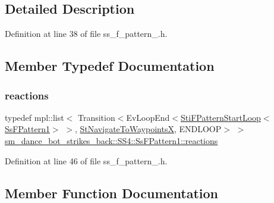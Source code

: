 \subsection{Detailed Description}


Definition at line 38 of file ss\+\_\+f\+\_\+pattern\+\_.\+h.



\subsection{Member Typedef Documentation}
\mbox{\label{structsm__dance__bot__strikes__back_1_1SS4_1_1SsFPattern1_acd918a85c4fdc759f80340faf7652b7d}} 
\subsubsection{\texorpdfstring{reactions}{reactions}}
{\footnotesize\ttfamily typedef mpl\+::list$<$ Transition$<$Ev\+Loop\+End$<$\hyperlink{structsm__dance__bot__strikes__back_1_1f__pattern__states_1_1StiFPatternStartLoop}{Sti\+F\+Pattern\+Start\+Loop}$<$\hyperlink{structsm__dance__bot__strikes__back_1_1SS4_1_1SsFPattern1}{Ss\+F\+Pattern1}$>$ $>$, \hyperlink{structsm__dance__bot__strikes__back_1_1StNavigateToWaypointsX}{St\+Navigate\+To\+WaypointsX}, E\+N\+D\+L\+O\+OP$>$ $>$ \hyperlink{structsm__dance__bot__strikes__back_1_1SS4_1_1SsFPattern1_acd918a85c4fdc759f80340faf7652b7d}{sm\+\_\+dance\+\_\+bot\+\_\+strikes\+\_\+back\+::\+S\+S4\+::\+Ss\+F\+Pattern1\+::reactions}}



Definition at line 46 of file ss\+\_\+f\+\_\+pattern\+\_.\+h.



\subsection{Member Function Documentation}
\mbox{\label{structsm__dance__bot__strikes__back_1_1SS4_1_1SsFPattern1_a268a3bbf45517f3d39de2f81a925bd99}} 
